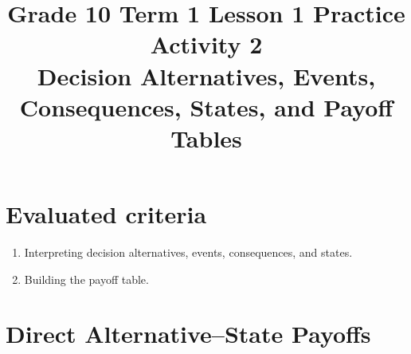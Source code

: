 \makeatletter
{}
\makeatother



\title{Grade 10 Term 1 Lesson 1 Practice Activity 2\\Decision Alternatives, Events, Consequences, States, and Payoff Tables}
\author{}
\date{}


	\maketitle
	\vspace{-2cm}
	\setcounter{tocdepth}{1}
	\setcounter{secnumdepth}{2}
	\label{toc}
	\tableofcontents

	\section*{Evaluated criteria}
	\begin{enumerate}[label=\textbf{C\arabic*.}]
		\item Interpreting decision alternatives, events, consequences, and states.
		\item Building the payoff table.
	\end{enumerate}

	\section{Direct Alternative--State Payoffs}
\label{sec:direct-alternative-state-payoffs}
